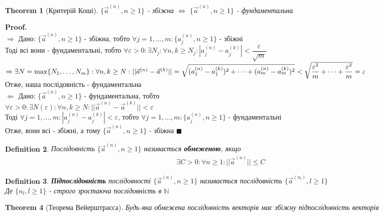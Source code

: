 \documentclass[a4paper, 14pt]{extarticle}
\def\bigline{\vspace{5mm}\\}
\def\rightproof{$\boxed{\Rightarrow}$ }
\def\leftproof{$\boxed{\Leftarrow}$ }
\theoremstyle{theoremdd}
\newtheorem{theorem}{Theorem}[subsection]
\theoremstyle{theoremdd}
\newtheorem{definition}[theorem]{Definition}
\theoremstyle{theoremdd}
\theoremstyle{theoremdd}
\theoremstyle{theoremdd}
\theoremstyle{theoremdd}
\theoremstyle{theoremdd}
\newenvironment{pf}{\vspace*{-3mm} \textbf{Proof. \\}}{$\blacksquare$}
\begin{document}
\begin{theorem}[Критерій Коші]
$\{\vec{a}^{(n)}, n \geq 1 \}$ - збіжна $\iff$ $\{\vec{a}^{(n)}, n \geq 1 \}$ - фундаментальна
\end{theorem}
\begin{pf}
\rightproof Дано: $\{\vec{a}^{(n)}, n \geq 1 \}$ - збіжна, тобто $\forall j = 1,\dots, m: \{a_j^{(n)}, n \geq 1\}$ - збіжні\\
Тоді всі вони - фундаментальні, тобто $\forall \varepsilon > 0: \exists N_j: \forall n,k \geq N_j: |a_j^{(n)} - a_j^{(k)}| < \dfrac{\varepsilon}{\sqrt{m}}$\\
$\Rightarrow \exists N = \max\{N_1,\dots,N_m\}: \forall n,k \geq N: \\ ||\vec{a}^{(n)} - \vec{a}^{(k)}|| = \sqrt{(a_1^{(n)} - a_1^{(k)})^2 + \dots + (a_m^{(n)} - a_m^{(k)})^2} < \sqrt{\dfrac{\varepsilon^2}{m} + \dots + \dfrac{\varepsilon^2}{m}} = \varepsilon$\\
Отже, наша послідовність - фундаментальна
\bigline
\leftproof Дано: $\{\vec{a}^{(n)}, n \geq 1 \}$ - фундаментальна, тобто \\
$\forall \varepsilon > 0: \exists N(\varepsilon): \forall n, k \geq N: ||\vec{a}^{(n)} - \vec{a}^{(k)}|| < \varepsilon$\\
Тоді $\forall j = 1,\dots, m: |a_j^{(n)} - a_j^{(k)}| < \varepsilon$, тобто $\forall j = 1,\dots, m: \{a_j^{(n)}, n \geq 1\}$ - фундаментальні\\
Отже, вони всі - збіжні, а тому $\{\vec{a}^{(n)}, n \geq 1 \}$ - збіжна
\end{pf}

\begin{definition}
Послідовність $\{\vec{a}^{(n)}, n \geq 1 \}$ називається \textbf{обмеженою}, якщо
\begin{align*}
\exists C > 0: \forall n \geq 1: ||\vec{a}^{(n)}|| \leq C
\end{align*}
\end{definition}

\begin{definition}
\textbf{Підпослідовність} послідовності $\{\vec{a}^{(n)}, n \geq 1 \}$ називається послідовність $\{\vec{a}^{(n_l)}, l \geq 1 \}$\\
Де $\{n_l, l \geq 1 \}$ - строго зростаюча послідовність в $\mathbb{N}$
\end{definition}

\begin{theorem}[Теорема Вейерштрасса]
Будь-яка обмежена послідовність векторів має збіжну підпослідовність векторів
\end{theorem}
\end{document}
